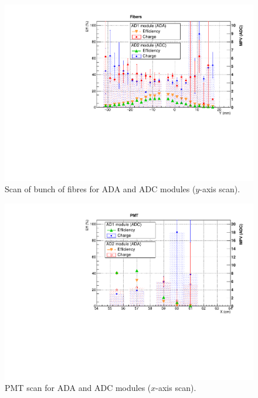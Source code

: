 	\begin{figure}[h!]
		\begin{center}
			\includegraphics[scale=0.5]{./images/scan/Fiber_scan.pdf}
			\caption{Scan of bunch of fibres for ADA and ADC modules ($y$-axis scan).}
			\label{figure:ScanFib}
		\end{center}
	\end{figure}
	
	\begin{figure}[h!]
	\begin{center}
	  \includegraphics[scale=0.5]{./images/scan/PMT_scan.pdf}
	  \caption{PMT scan for ADA and ADC modules ($x$-axis scan).}
	  \label{figure:scanPMT}
	\end{center}
	\end{figure}

